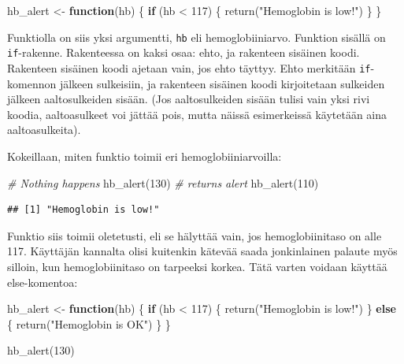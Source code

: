 \documentclass[
]{book}
\newenvironment{Shaded}{\begin{snugshade}}{\end{snugshade}}
\newcommand{\CommentTok}[1]{\textcolor[rgb]{0.56,0.35,0.01}{\textit{#1}}}
\newcommand{\ControlFlowTok}[1]{\textcolor[rgb]{0.13,0.29,0.53}{\textbf{#1}}}
\newcommand{\DecValTok}[1]{\textcolor[rgb]{0.00,0.00,0.81}{#1}}
\newcommand{\FunctionTok}[1]{\textcolor[rgb]{0.00,0.00,0.00}{#1}}
\newcommand{\NormalTok}[1]{#1}
\newcommand{\OtherTok}[1]{\textcolor[rgb]{0.56,0.35,0.01}{#1}}
\newcommand{\SpecialCharTok}[1]{\textcolor[rgb]{0.00,0.00,0.00}{#1}}
\newcommand{\StringTok}[1]{\textcolor[rgb]{0.31,0.60,0.02}{#1}}
\begin{document}
\begin{Shaded}
\begin{Highlighting}[]
\NormalTok{hb\_alert }\OtherTok{\textless{}{-}} \ControlFlowTok{function}\NormalTok{(hb) \{}
  \ControlFlowTok{if}\NormalTok{ (hb }\SpecialCharTok{\textless{}} \DecValTok{117}\NormalTok{) \{}
    \FunctionTok{return}\NormalTok{(}\StringTok{"Hemoglobin is low!"}\NormalTok{)}
\NormalTok{  \}}
\NormalTok{\}}
\end{Highlighting}
\end{Shaded}

Funktiolla on siis yksi argumentti, \texttt{hb} eli hemoglobiiniarvo. Funktion sisällä on \texttt{if}-rakenne. Rakenteessa on kaksi osaa: ehto, ja rakenteen sisäinen koodi. Rakenteen sisäinen koodi ajetaan vain, jos ehto täyttyy. Ehto merkitään \texttt{if}-komennon jälkeen sulkeisiin, ja rakenteen sisäinen koodi kirjoitetaan sulkeiden jälkeen aaltosulkeiden sisään. (Jos aaltosulkeiden sisään tulisi vain yksi rivi koodia, aaltoasulkeet voi jättää pois, mutta näissä esimerkeissä käytetään aina aaltoasulkeita).

Kokeillaan, miten funktio toimii eri hemoglobiiniarvoilla:

\begin{Shaded}
\begin{Highlighting}[]
\CommentTok{\# Nothing happens}
\FunctionTok{hb\_alert}\NormalTok{(}\DecValTok{130}\NormalTok{)}
\CommentTok{\# returns alert}
\FunctionTok{hb\_alert}\NormalTok{(}\DecValTok{110}\NormalTok{)}
\end{Highlighting}
\end{Shaded}

\begin{verbatim}
## [1] "Hemoglobin is low!"
\end{verbatim}

Funktio siis toimii oletetusti, eli se hälyttää vain, jos hemoglobiinitaso on alle 117. Käyttäjän kannalta olisi kuitenkin kätevää saada jonkinlainen palaute myös silloin, kun hemoglobiinitaso on tarpeeksi korkea. Tätä varten voidaan käyttää else-komentoa:

\begin{Shaded}
\begin{Highlighting}[]
\NormalTok{hb\_alert }\OtherTok{\textless{}{-}} \ControlFlowTok{function}\NormalTok{(hb) \{}
  \ControlFlowTok{if}\NormalTok{ (hb }\SpecialCharTok{\textless{}} \DecValTok{117}\NormalTok{) \{}
    \FunctionTok{return}\NormalTok{(}\StringTok{"Hemoglobin is low!"}\NormalTok{)}
\NormalTok{  \} }\ControlFlowTok{else}\NormalTok{ \{}
    \FunctionTok{return}\NormalTok{(}\StringTok{"Hemoglobin is OK"}\NormalTok{)}
\NormalTok{  \}}
\NormalTok{\}}

\FunctionTok{hb\_alert}\NormalTok{(}\DecValTok{130}\NormalTok{)}
\end{Highlighting}
\end{Shaded}
\end{document}

